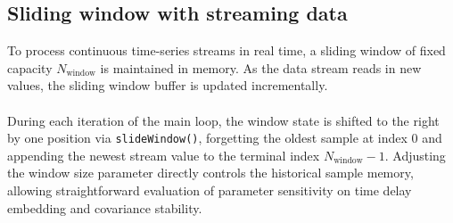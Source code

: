 \subsection{Sliding window with streaming data}
\label{section:SlidingWindowWithStreamingData}
To process continuous time-series streams in real time, a sliding window of fixed capacity $N_{\text{window}}$ is maintained in memory. As the data stream reads in new values, the sliding window buffer is updated incrementally.\\ \\

During each iteration of the main loop, the window state is shifted to the right by one position via \texttt{slideWindow()}, forgetting the oldest sample at index 0 and appending the newest stream value to the terminal index $N_{\text{window}} - 1$. Adjusting the window size parameter directly controls the historical sample memory, allowing straightforward evaluation of parameter sensitivity on time delay embedding and covariance stability.